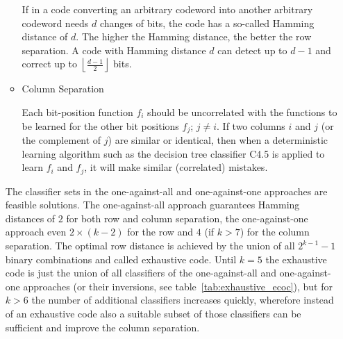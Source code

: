\documentclass[article,type=msc,colorback,accentcolor=tud7b]{tudthesis}
\begin{document}
\begin{itemize}
\begin{itemize}
            If in a code converting an arbitrary codeword into another arbitrary codeword needs $d$ changes of bits, the code has a so-called Hamming distance of $d$. The higher the Hamming distance, the better the row separation. A code with Hamming distance $d$ can detect up to $d-1$ and correct up to $\left\lfloor\frac{d-1}{2}\right\rfloor$ bits.
          \item Column Separation

            Each bit-position function $f_{i}$ should be uncorrelated with the functions to be learned for the other bit positions $f_{j}$; $j\neq i$. If two columns $i$ and $j$ (or the complement of $j$) are similar or identical, then when a deterministic learning algorithm such as the decision tree classifier C4.5 is applied to learn $f_{i}$ and $f_{j}$, it will make similar (correlated) mistakes.
        \end{itemize}
        The classifier sets in the one-against-all and one-against-one approaches are feasible solutions. The one-against-all approach guarantees Hamming distances of $2$ for both row and column separation, the one-against-one approach even $2\times(k-2)$ for the row and $4$ (if $k>7$) for the column separation. The optimal row distance is achieved by the union of all $2^{k-1}-1$ binary combinations and called exhaustive code. Until $k=5$ the exhaustive code is just the union of all classifiers of the one-against-all and one-against-one approaches (or their inversions, see table~\ref{tab:exhaustive_ecoc}), but for $k>6$ the number of additional classifiers increases quickly, wherefore instead of an exhaustive code also a suitable subset of those classifiers can be sufficient and improve the column separation.
  

\end{itemize}
\end{document}
